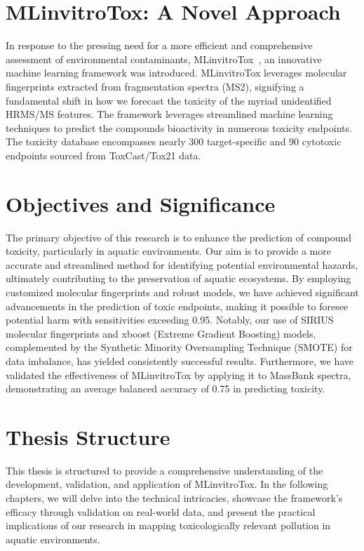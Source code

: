 \section{MLinvitroTox: A Novel Approach}

In response to the pressing need for a more efficient and comprehensive assessment of environmental contaminants, MLinvitroTox~\cite{arturi}, an innovative machine learning framework was introduced. MLinvitroTox leverages molecular fingerprints extracted from fragmentation spectra (MS2), signifying a fundamental shift in how we forecast the toxicity of the myriad unidentified HRMS/MS features. The framework leverages streamlined machine learning techniques to predict the compounds bioactivity in numerous toxicity endpoints. The toxicity database encompasses nearly 300 target-specific and 90 cytotoxic endpoints sourced from ToxCast/Tox21 data.

\section{Objectives and Significance}

The primary objective of this research is to enhance the prediction of compound toxicity, particularly in aquatic environments. Our aim is to provide a more accurate and streamlined method for identifying potential environmental hazards, ultimately contributing to the preservation of aquatic ecosystems. By employing customized molecular fingerprints and robust models, we have achieved significant advancements in the prediction of toxic endpoints, making it possible to foresee potential harm with sensitivities exceeding 0.95. Notably, our use of SIRIUS molecular fingerprints and xboost (Extreme Gradient Boosting) models, complemented by the Synthetic Minority Oversampling Technique (SMOTE) for data imbalance, has yielded consistently successful results. Furthermore, we have validated the effectiveness of MLinvitroTox by applying it to MassBank spectra, demonstrating an average balanced accuracy of 0.75 in predicting toxicity.

\section{Thesis Structure}

This thesis is structured to provide a comprehensive understanding of the development, validation, and application of MLinvitroTox. In the following chapters, we will delve into the technical intricacies, showcase the framework's efficacy through validation on real-world data, and present the practical implications of our research in mapping toxicologically relevant pollution in aquatic environments.

